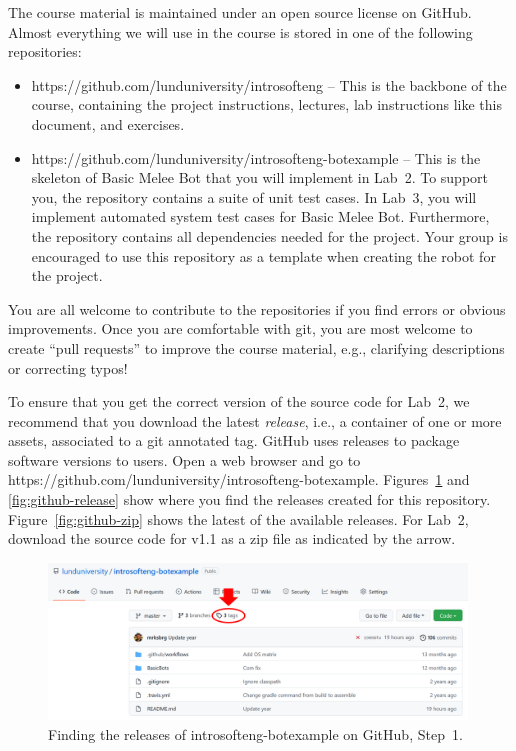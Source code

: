 \documentclass{scrreprt}
\begin{document}
The course material is maintained under an open source license on GitHub. Almost everything we will use in the course is stored in one of the following repositories:
\begin{itemize}
\item https://github.com/lunduniversity/introsofteng -- This is the backbone of the course, containing the project instructions, lectures, lab instructions like this document, and exercises.
\item https://github.com/lunduniversity/introsofteng-botexample -- This is the skeleton of Basic Melee Bot that you will implement in Lab~2. To support you, the repository contains a suite of unit test cases. In Lab~3, you will implement automated system test cases for Basic Melee Bot. Furthermore, the repository contains all dependencies needed for the project. Your group is encouraged to use this repository as a template when creating the robot for the project.
\end{itemize}

You are all welcome to contribute to the repositories if you find errors or obvious improvements. Once you are comfortable with git, you are most welcome to create ``pull requests'' to improve the course material, e.g., clarifying descriptions or correcting typos!

To ensure that you get the correct version of the source code for Lab~2, we recommend that you download the latest \textit{release}, i.e., a container of one or more assets, associated to a git annotated tag. GitHub uses releases to package software versions to users. Open a web browser and go to https://github.com/lunduniversity/introsofteng-botexample. Figures~\ref{fig:github-tags} and \ref{fig:github-release} show where you find the releases created for this repository.  Figure~\ref{fig:github-zip} shows the latest of the available releases. For Lab~2, download the source code for v1.1 as a zip file as indicated by the arrow.


\begin{figure}
\centering
\includegraphics[width=0.99\textwidth]{figures/GitHub-tags.png}
\caption{Finding the releases of introsofteng-botexample on GitHub, Step~1.}
\label{fig:github-tags}
\end{figure}
\end{document}
